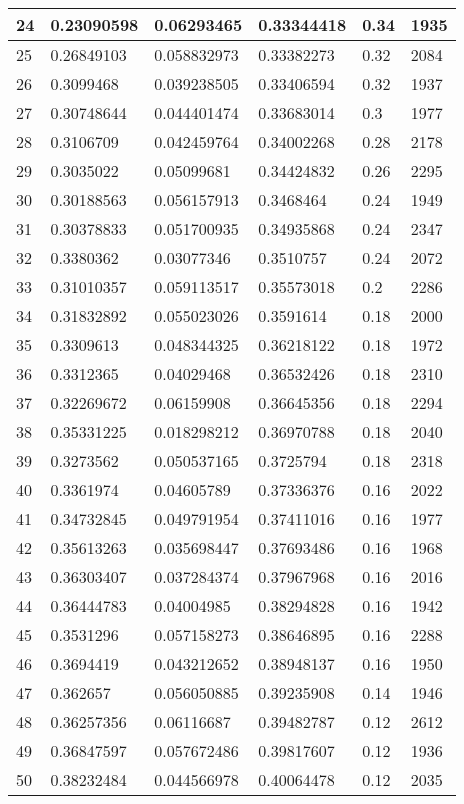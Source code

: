 \begin{longtable}{|l|l|l|l|l|l|}
24 & 0.23090598 & 0.06293465 & 0.33344418 & 0.34 & 1935 \\ \hline 
25 & 0.26849103 & 0.058832973 & 0.33382273 & 0.32 & 2084 \\ \hline 
26 & 0.3099468 & 0.039238505 & 0.33406594 & 0.32 & 1937 \\ \hline 
27 & 0.30748644 & 0.044401474 & 0.33683014 & 0.3 & 1977 \\ \hline 
28 & 0.3106709 & 0.042459764 & 0.34002268 & 0.28 & 2178 \\ \hline 
29 & 0.3035022 & 0.05099681 & 0.34424832 & 0.26 & 2295 \\ \hline 
30 & 0.30188563 & 0.056157913 & 0.3468464 & 0.24 & 1949 \\ \hline 
31 & 0.30378833 & 0.051700935 & 0.34935868 & 0.24 & 2347 \\ \hline 
32 & 0.3380362 & 0.03077346 & 0.3510757 & 0.24 & 2072 \\ \hline 
33 & 0.31010357 & 0.059113517 & 0.35573018 & 0.2 & 2286 \\ \hline 
34 & 0.31832892 & 0.055023026 & 0.3591614 & 0.18 & 2000 \\ \hline 
35 & 0.3309613 & 0.048344325 & 0.36218122 & 0.18 & 1972 \\ \hline 
36 & 0.3312365 & 0.04029468 & 0.36532426 & 0.18 & 2310 \\ \hline 
37 & 0.32269672 & 0.06159908 & 0.36645356 & 0.18 & 2294 \\ \hline 
38 & 0.35331225 & 0.018298212 & 0.36970788 & 0.18 & 2040 \\ \hline 
39 & 0.3273562 & 0.050537165 & 0.3725794 & 0.18 & 2318 \\ \hline 
40 & 0.3361974 & 0.04605789 & 0.37336376 & 0.16 & 2022 \\ \hline 
41 & 0.34732845 & 0.049791954 & 0.37411016 & 0.16 & 1977 \\ \hline 
42 & 0.35613263 & 0.035698447 & 0.37693486 & 0.16 & 1968 \\ \hline 
43 & 0.36303407 & 0.037284374 & 0.37967968 & 0.16 & 2016 \\ \hline 
44 & 0.36444783 & 0.04004985 & 0.38294828 & 0.16 & 1942 \\ \hline 
45 & 0.3531296 & 0.057158273 & 0.38646895 & 0.16 & 2288 \\ \hline 
46 & 0.3694419 & 0.043212652 & 0.38948137 & 0.16 & 1950 \\ \hline 
47 & 0.362657 & 0.056050885 & 0.39235908 & 0.14 & 1946 \\ \hline 
48 & 0.36257356 & 0.06116687 & 0.39482787 & 0.12 & 2612 \\ \hline 
49 & 0.36847597 & 0.057672486 & 0.39817607 & 0.12 & 1936 \\ \hline 
50 & 0.38232484 & 0.044566978 & 0.40064478 & 0.12 & 2035 \\ \hline 
\end{longtable}